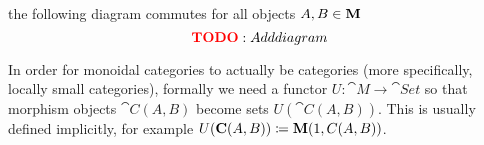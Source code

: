 \begin{definition}
\begin{thmenum}
    \item the following diagram commutes for all objects \( A, B \in \operatorname{\mathbf{M}} \)
    \begin{equation*}
      \todo{Add diagram}\iffalse\begin{mplibcode}
        u := 2cm;

        beginfig(1);
        input metapost/graphs;

        v1 := thelabel("$C(A, B)$", origin);
        v2 := thelabel("$C(B, B) \otimes C(A, B)$", (-2, 1) scaled u);
        v3 := thelabel("$1 \otimes C(A, B)$", (-2, -1) scaled u);
        v4 := thelabel("$C(A, B) \otimes C(A, A)$", (2, 1) scaled u);
        v5 := thelabel("$C(A, B) \otimes 1$", (2, -1) scaled u);

        a1 := straight_arc(v2, v1);
        a2 := straight_arc(v4, v1);
        a3 := straight_arc(v3, v1);
        a4 := straight_arc(v5, v1);
        a5 := straight_arc(v3, v2);
        a6 := straight_arc(v5, v4);

        draw_vertices(v);
        draw_arcs(a);

        label.urt("$\circ_{A, B, B}$", straight_arc_midpoint of a1);
        label.ulft("$\circ_{A, A, B}$", straight_arc_midpoint of a2);
        label.lrt("$\lambda$", straight_arc_midpoint of a3);
        label.llft("$\rho$", straight_arc_midpoint of a4);
        label.lft("$j_B \otimes \id_{C(A, B)}$", straight_arc_midpoint of a5);
        label.rt("$\id_{C(A, B)} \otimes j_A$", straight_arc_midpoint of a6);
        endfig;
      \end{mplibcode}\fi
    \end{equation*}
  \end{thmenum}

  In order for monoidal categories to actually be categories (more specifically, locally small categories), formally we need a functor \( U: \cat{M} \to \cat{Set} \) so that morphism objects \( \cat{C}(A, B) \) become sets \( U(\cat{C}(A, B)) \). This is usually defined implicitly, for example \( U(\operatorname{\mathbf{C}}(A, B)) \coloneqq \operatorname{\mathbf{M}}(1, C(A, B)) \).
\end{definition}
